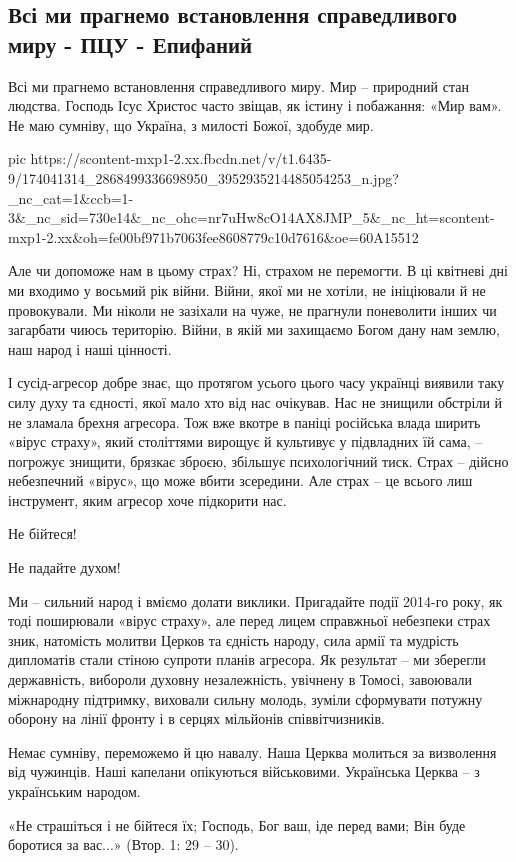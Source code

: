  
 
 
 
 
\subsection{Всі ми прагнемо встановлення справедливого миру - ПЦУ - Епифаний}
\label{sec:16_04_2021.fb.promovugroup.2.cerkov_mir_ukraina_epifanij}

Всі ми прагнемо встановлення справедливого миру. Мир – природний стан людства.
Господь Ісус Христос часто звіщав, як істину і побажання: «Мир вам». Не маю
сумніву, що Україна, з милості Божої, здобуде мир.  

\ifcmt
  pic https://scontent-mxp1-2.xx.fbcdn.net/v/t1.6435-9/174041314_2868499336698950_3952935214485054253_n.jpg?_nc_cat=1&ccb=1-3&_nc_sid=730e14&_nc_ohc=nr7uHw8cO14AX8JMP_5&_nc_ht=scontent-mxp1-2.xx&oh=fe00bf971b7063fee8608779c10d7616&oe=60A15512
\fi

Але чи допоможе нам в цьому страх? Ні, страхом не перемогти.  В ці квітневі дні
ми входимо у восьмий рік війни. Війни, якої ми не хотіли, не ініціювали й не
провокували. Ми ніколи не зазіхали на чуже, не прагнули поневолити інших чи
загарбати чиюсь територію. Війни, в якій ми захищаємо Богом дану нам землю, наш
народ і наші цінності.     

І сусід-агресор добре знає, що протягом усього цього часу українці виявили таку
силу духу та єдності, якої мало хто від нас очікував. Нас не знищили обстріли й
не зламала брехня агресора. Тож вже вкотре в паніці російська влада ширить
«вірус страху», який століттями вирощує й культивує у підвладних їй сама, –
погрожує знищити, брязкає зброєю, збільшує психологічний тиск. Страх – дійсно
небезпечний «вірус», що може вбити зсередини. Але страх – це всього лиш
інструмент, яким агресор хоче підкорити нас. 

Не бійтеся! 

Не падайте духом! 

Ми – сильний народ і вміємо долати виклики. Пригадайте події 2014-го року, як
тоді поширювали «вірус страху», але перед лицем справжньої небезпеки страх
зник, натомість молитви Церков та єдність народу, сила армії та мудрість
дипломатів стали стіною супроти планів агресора. Як результат – ми зберегли
державність, вибороли духовну незалежність, увічнену в Томосі, завоювали
міжнародну підтримку, виховали сильну молодь, зуміли сформувати потужну оборону
на лінії фронту і в серцях мільйонів співвітчизників. 

Немає сумніву, переможемо й цю навалу. Наша Церква молиться за визволення від
чужинців. Наші капелани опікуються  військовими. Українська Церква – з
українським народом.  

«Не страшіться і не бійтеся їх; Господь, Бог ваш, іде перед вами; Він буде
боротися за вас...» (Втор. 1: 29 – 30).

